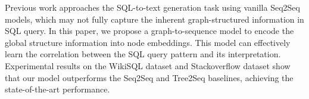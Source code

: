 Previous work approaches the SQL-to-text generation task using vanilla Seq2Seq models, which may not fully capture the inherent graph-structured information in SQL query. In this paper, we propose a graph-to-sequence model to encode the global structure information into node embeddings. This model can effectively learn the correlation between the SQL query pattern and its interpretation. Experimental results on the WikiSQL dataset and Stackoverflow dataset show that our model outperforms the Seq2Seq and Tree2Seq baselines, achieving the state-of-the-art performance.
